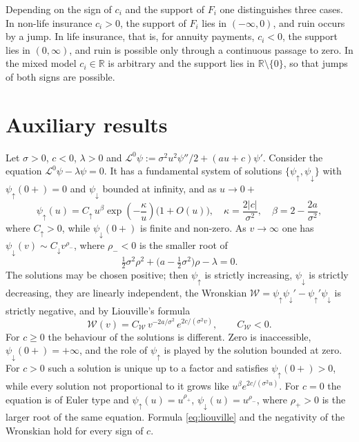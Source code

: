 \documentclass[smallextended]{svjour3}
\newcommand{\bbr}{\mathbb{R}}
\newcommand{\pup}{\psi_{\uparrow}}
\newcommand{\pdn}{\psi_{\downarrow}}
\begin{document}
Depending on the sign of $c_i$ and the support of $F_i$ one distinguishes
three cases. In non-life insurance $c_i>0$, the support of $F_i$ lies in
$(-\infty,0)$, and ruin occurs by a jump. In life insurance, that is, for
annuity payments, $c_i<0$, the support lies in $(0,\infty)$, and ruin is
possible only through a continuous passage to zero. In the mixed model
$c_i\in\bbr$ is arbitrary and the support lies in $\bbr\setminus\{0\}$, so
that jumps of both signs are possible.

\section{Auxiliary results}
\label{s3}

\begin{lemma}
\label{lem:asymptotics}
Let $\sigma>0$, $c<0$, $\lambda>0$ and
$\mathcal L^0\psi:=\sigma^2u^2\psi''/2+(au+c)\psi'$. Consider the equation
$\mathcal L^0\psi-\lambda\psi=0$. It has a fundamental system of solutions
$\{\pup,\pdn\}$ with $\pup(0+)=0$ and $\pdn$ bounded at infinity, and as
$u\to0+$
\begin{equation}
    \label{eq:psi_asympt}
    \pup(u)=C_\uparrow\,u^{\beta}\exp\left(-\frac{\kappa}{u}\right)
    \bigl(1+O(u)\bigr),\quad \kappa=\frac{2|c|}{\sigma^2},\quad
    \beta=2-\frac{2a}{\sigma^2},
\end{equation}
where $C_\uparrow>0$, while $\pdn(0+)$ is finite and non-zero. As
$v\to\infty$ one has $\pdn(v)\sim C_\downarrow v^{\rho_-}$, where $\rho_-<0$
is the smaller root of
$$
    \tfrac12\sigma^2\rho^2+\bigl(a-\tfrac12\sigma^2\bigr)\rho-\lambda=0 .
$$
The solutions may be chosen positive; then $\pup$ is strictly increasing,
$\pdn$ is strictly decreasing, they are linearly independent, the Wronskian
$\mathcal W=\pup\pdn'-\pup'\pdn$ is strictly negative, and by Liouville's
formula
\begin{equation}
    \label{eq:liouville}
    \mathcal W(v)=C_{\mathcal W}\,v^{-2a/\sigma^2}\,e^{2c/(\sigma^2v)},
    \qquad C_{\mathcal W}<0 .
\end{equation}
For $c\ge0$ the behaviour of the solutions is different. Zero is inaccessible,
$\pdn(0+)=+\infty$, and the role of $\pup$ is played by the solution bounded at
zero. For $c>0$ such a solution is unique up to a factor and satisfies
$\pup(0+)>0$, while every solution not proportional to it grows like
$u^{\beta}e^{2c/(\sigma^2u)}$. For $c=0$ the equation is of Euler type and
$\pup(u)=u^{\rho_+}$, $\pdn(u)=u^{\rho_-}$, where $\rho_+>0$ is the larger root
of the same equation. Formula \eqref{eq:liouville} and the negativity of the
Wronskian hold for every sign of $c$.
\end{lemma}
\end{document}
